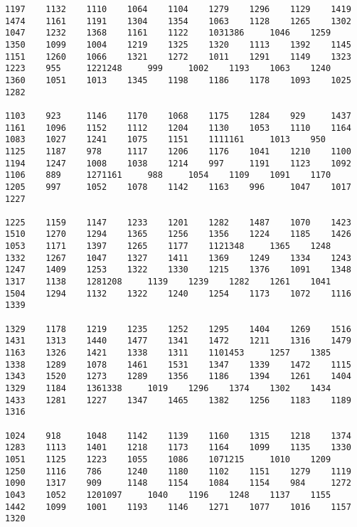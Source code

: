 \begin{verbatim}
1197    1132    1110    1064    1104    1279    1296    1129    1419    1474    1161    1191    1304    1354    1063    1128    1265    1302    1047    1232    1368    1161    1122    1031386     1046    1259    1350    1099    1004    1219    1325    1320    1113    1392    1145    1151    1260    1066    1321    1272    1011    1291    1149    1323    1223    955     1221248     999     1002    1193    1063    1240    1360    1051    1013    1345    1198    1186    1178    1093    1025    1282

1103    923     1146    1170    1068    1175    1284    929     1437    1161    1096    1152    1112    1204    1130    1053    1110    1164    1083    1027    1241    1075    1151    1111161     1013    950     1125    1187    978     1117    1206    1176    1041    1210    1100    1194    1247    1008    1038    1214    997     1191    1123    1092    1106    889     1271161     988     1054    1109    1091    1170    1205    997     1052    1078    1142    1163    996     1047    1017    1227

1225    1159    1147    1233    1201    1282    1487    1070    1423    1510    1270    1294    1365    1256    1356    1224    1185    1426    1053    1171    1397    1265    1177    1121348     1365    1248    1332    1267    1047    1327    1411    1369    1249    1334    1243    1247    1409    1253    1322    1330    1215    1376    1091    1348    1317    1138    1281208     1139    1239    1282    1261    1041    1504    1294    1132    1322    1240    1254    1173    1072    1116    1339

1329    1178    1219    1235    1252    1295    1404    1269    1516    1431    1313    1440    1477    1341    1472    1211    1316    1479    1163    1326    1421    1338    1311    1101453     1257    1385    1338    1289    1078    1461    1531    1347    1339    1472    1115    1343    1520    1273    1289    1356    1186    1394    1261    1404    1329    1184    1361338     1019    1296    1374    1302    1434    1433    1281    1227    1347    1465    1382    1256    1183    1189    1316

1024    918     1048    1142    1139    1160    1315    1218    1374    1283    1113    1401    1218    1173    1164    1099    1135    1330    1051    1125    1223    1055    1086    1071215     1010    1209    1250    1116    786     1240    1180    1102    1151    1279    1119    1090    1317    909     1148    1154    1084    1154    984     1272    1043    1052    1201097     1040    1196    1248    1137    1155    1442    1099    1001    1193    1146    1271    1077    1016    1157    1320


\end{verbatim}
